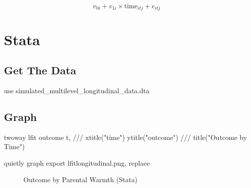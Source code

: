 \documentclass[
  letterpaper,
  DIV=11,
  numbers=noendperiod]{scrreprt}
\newenvironment{Shaded}{\begin{snugshade}}{\end{snugshade}}
\newcommand{\BaseNTok}[1]{\textcolor[rgb]{0.68,0.00,0.00}{#1}}
\newcommand{\CommentTok}[1]{\textcolor[rgb]{0.37,0.37,0.37}{#1}}
\newcommand{\KeywordTok}[1]{\textcolor[rgb]{0.00,0.23,0.31}{#1}}
\newcommand{\NormalTok}[1]{\textcolor[rgb]{0.00,0.23,0.31}{#1}}
\newcommand{\StringTok}[1]{\textcolor[rgb]{0.13,0.47,0.30}{#1}}
\begin{document}
\[v_{0i} + v_{1i} \times \text{time}_{itj} + e_{itj}\]

\section{Stata}

\subsection{Get The Data}\label{get-the-data-3}

\begin{Shaded}
\begin{Highlighting}[]

\KeywordTok{use}\NormalTok{ simulated\_multilevel\_longitudinal\_data.dta}
\end{Highlighting}
\end{Shaded}

\subsection{Graph}\label{graph-3}

\begin{Shaded}
\begin{Highlighting}[]
\KeywordTok{twoway} \KeywordTok{lfit}\NormalTok{ outcome t, }\CommentTok{///}
  \BaseNTok{xtitle}\NormalTok{(}\StringTok{"time"}\NormalTok{) }\BaseNTok{ytitle}\NormalTok{(}\StringTok{"outcome"}\NormalTok{) }\CommentTok{///}
  \BaseNTok{title}\NormalTok{(}\StringTok{"Outcome by Time"}\NormalTok{) }

\KeywordTok{quietly} \KeywordTok{graph} \KeywordTok{export}\NormalTok{ lfitlongitudinal.png, }\KeywordTok{replace}
\end{Highlighting}
\end{Shaded}

\begin{figure}


\caption{\label{fig-Statalongitudinal}Outcome by Parental Warmth
(Stata)}

\end{figure}%
\end{document}
